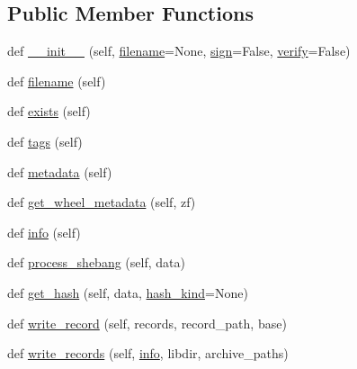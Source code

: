 \subsection*{Public Member Functions}
\begin{DoxyCompactItemize}
\item 
def \hyperlink{classpip_1_1__vendor_1_1distlib_1_1wheel_1_1Wheel_a0ad495b8abe6ed7e24962ef32daa48b2}{\+\_\+\+\_\+init\+\_\+\+\_\+} (self, \hyperlink{classpip_1_1__vendor_1_1distlib_1_1wheel_1_1Wheel_a6110ed047c86b977e51a75f43323485e}{filename}=None, \hyperlink{classpip_1_1__vendor_1_1distlib_1_1wheel_1_1Wheel_ad67a8f9a21c79458bbcf626898aadf94}{sign}=False, \hyperlink{classpip_1_1__vendor_1_1distlib_1_1wheel_1_1Wheel_a3792fb283924a1add010ebf4fc259a76}{verify}=False)
\item 
def \hyperlink{classpip_1_1__vendor_1_1distlib_1_1wheel_1_1Wheel_a6110ed047c86b977e51a75f43323485e}{filename} (self)
\item 
def \hyperlink{classpip_1_1__vendor_1_1distlib_1_1wheel_1_1Wheel_a20a7741e7497c517c6794789f5933cbb}{exists} (self)
\item 
def \hyperlink{classpip_1_1__vendor_1_1distlib_1_1wheel_1_1Wheel_a02d69461124ef17ab7d4fc8e26d46ee5}{tags} (self)
\item 
def \hyperlink{classpip_1_1__vendor_1_1distlib_1_1wheel_1_1Wheel_a520871522a9392772afac6f007c16a14}{metadata} (self)
\item 
def \hyperlink{classpip_1_1__vendor_1_1distlib_1_1wheel_1_1Wheel_a2cad90a8034603d0a6d63ae827357e8c}{get\+\_\+wheel\+\_\+metadata} (self, zf)
\item 
def \hyperlink{classpip_1_1__vendor_1_1distlib_1_1wheel_1_1Wheel_a6748bdb231092617672c163d8de404fe}{info} (self)
\item 
def \hyperlink{classpip_1_1__vendor_1_1distlib_1_1wheel_1_1Wheel_ad14cfd14b7b37bbec4a1f8bd832d5c8d}{process\+\_\+shebang} (self, data)
\item 
def \hyperlink{classpip_1_1__vendor_1_1distlib_1_1wheel_1_1Wheel_a1089055ba5c5306618dc438ce9c69b7f}{get\+\_\+hash} (self, data, \hyperlink{classpip_1_1__vendor_1_1distlib_1_1wheel_1_1Wheel_aa316c6c26673783981d184653ca3fba3}{hash\+\_\+kind}=None)
\item 
def \hyperlink{classpip_1_1__vendor_1_1distlib_1_1wheel_1_1Wheel_a4d29542158c7cef59f91784a5e358449}{write\+\_\+record} (self, records, record\+\_\+path, base)
\item 
def \hyperlink{classpip_1_1__vendor_1_1distlib_1_1wheel_1_1Wheel_adc805b0d0ec56a7e8c56570cced65bef}{write\+\_\+records} (self, \hyperlink{classpip_1_1__vendor_1_1distlib_1_1wheel_1_1Wheel_a6748bdb231092617672c163d8de404fe}{info}, libdir, archive\+\_\+paths)

\end{DoxyCompactItemize}
